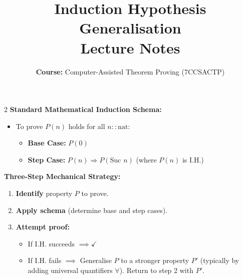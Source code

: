 \documentclass[10pt,a4paper]{article}
\title{\textbf{\huge Induction Hypothesis Generalisation}\\[0.3em]
\large Lecture Notes}
\author{\textbf{Course:} Computer-Assisted Theorem Proving (7CCSACTP)}
\date{}
\begin{document}
\maketitle
\vspace{-1.5em}

\begin{tcolorbox}[title={1. Mathematical Induction Recipe \& Generalisation Strategy}]
\begin{multicols}{2}
\textbf{Standard Mathematical Induction Schema:}
\begin{itemize}[leftmargin=1.2em, itemsep=2pt]
    \item To prove $P(n)$ holds for all $n :: \text{nat}$:
    \begin{itemize}[leftmargin=1em, label=$\bullet$]
        \item \textbf{Base Case:} $P(0)$
        \item \textbf{Step Case:} $P(n) \Longrightarrow P(\text{Suc } n)$ \quad (where $P(n)$ is I.H.)
    \end{itemize}
\end{itemize}

\columnbreak

\textbf{Three-Step Mechanical Strategy:}
\begin{enumerate}[leftmargin=1.2em, itemsep=2pt]
    \item \textbf{Identify} property $P$ to prove.
    \item \textbf{Apply schema} (determine base and step cases).
    \item \textbf{Attempt proof:}
    \begin{itemize}[leftmargin=1em, label=$\bullet$]
        \item If I.H. succeeds $\implies \checkmark$
        \item If I.H. fails $\implies$ Generalise $P$ to a stronger property $P'$ (typically by adding universal quantifiers $\forall$). Return to step 2 with $P'$.
    \end{itemize}
\end{enumerate}
\end{multicols}
\end{tcolorbox}

\vspace{0.3em}
\end{document}
